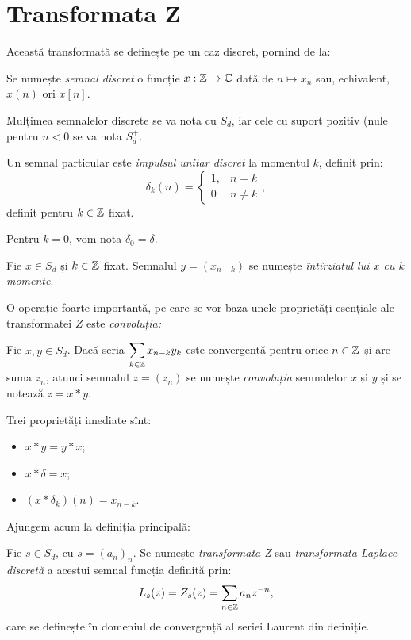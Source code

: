 \chapter{Transformata Z}

Această transformată se definește pe un caz discret, pornind de la:
\begin{definition}\label{def:semnal}
  Se numește \emph{semnal discret} o funcție $ x : \mathbb{Z} \to \mathbb{C} $ dată
  de $ n \mapsto x_n $ sau, echivalent, $ x(n) $ ori $ x[n] $.
\end{definition}

Mulțimea semnalelor discrete se va nota cu $ S_d $, iar cele cu suport pozitiv
(nule pentru $ n < 0 $ se va nota $ S_d^+ $.

Un semnal particular este \emph{impulsul unitar discret} la momentul $ k $,
definit prin:
\[
  \delta_k(n) = \begin{cases} 1, & n = k \\ 0 & n \neq k \end{cases},
\]
definit pentru $ k \in \mathbb{Z} $ fixat.

Pentru $ k = 0 $, vom nota $ \delta_0 = \delta $.

\begin{definition}\label{def:intirziat} 
  Fie $ x \in S_d $ și $ k \in \mathbb{Z} $ fixat. Semnalul $ y = (x_{n-k}) $ se numește
  \emph{întîrziatul lui $ x $ cu $ k $ momente}.
\end{definition}

O operație foarte importantă, pe care se vor baza unele proprietăți esențiale ale
transformatei $ Z $ este \emph{convoluția:} 
\begin{definition}\label{def:convolutie}
  Fie $ x, y \in S_d $. Dacă seria $ \displaystyle\sum_{k \in \mathbb{Z}} x_{n-k} y_k $
  este convergentă pentru orice $ n \in \mathbb{Z} $ și are suma $ z_n $, atunci semnalul
  $ z = (z_n) $ se numește \emph{convoluția} semnalelor $ x $ și $ y $ și
  se notează $ z = x \ast y $.
\end{definition}

Trei proprietăți imediate sînt:
\begin{itemize}
\item $ x \ast y = y \ast x $;
\item $ x \ast \delta = x $;
\item $ (x \ast \delta_k)(n) = x_{n - k} $.
\end{itemize}

Ajungem acum la definiția principală:
\begin{definition}\label{def:z}
  Fie $ s \in S_d $, cu $ s = (a_n)_n $. Se numește \emph{transformata Z} sau
  \emph{transformata Laplace discretă} a acestui semnal funcția definită prin:
  \[
    L_s(z) = Z_s(z) = \sum_{n \in \mathbb{Z}} a_n z^{-n},
  \]
  care se definește în domeniul de convergență al seriei Laurent din definiție.
\end{definition}

